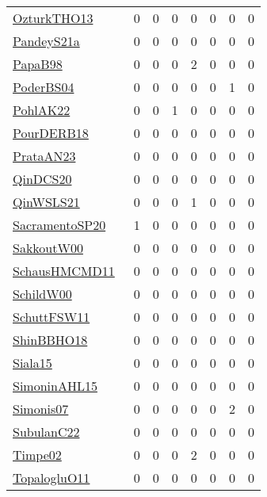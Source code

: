 {\begin{longtable}{l*{7}{r}}
\href{articles/OzturkTHO13.pdf}{OzturkTHO13}~\cite{OzturkTHO13} & 0 & 0 & 0 & 0 & 0 & 0 & 0\\
\href{articles/PandeyS21a.pdf}{PandeyS21a}~\cite{PandeyS21a} & 0 & 0 & 0 & 0 & 0 & 0 & 0\\
\href{articles/PapaB98.pdf}{PapaB98}~\cite{PapaB98} & 0 & 0 & 0 & 2 & 0 & 0 & 0\\
\href{articles/PoderBS04.pdf}{PoderBS04}~\cite{PoderBS04} & 0 & 0 & 0 & 0 & 0 & 1 & 0\\
\href{articles/PohlAK22.pdf}{PohlAK22}~\cite{PohlAK22} & 0 & 0 & 1 & 0 & 0 & 0 & 0\\
\href{articles/PourDERB18.pdf}{PourDERB18}~\cite{PourDERB18} & 0 & 0 & 0 & 0 & 0 & 0 & 0\\
\href{articles/PrataAN23.pdf}{PrataAN23}~\cite{PrataAN23} & 0 & 0 & 0 & 0 & 0 & 0 & 0\\
\href{articles/QinDCS20.pdf}{QinDCS20}~\cite{QinDCS20} & 0 & 0 & 0 & 0 & 0 & 0 & 0\\
\href{articles/QinWSLS21.pdf}{QinWSLS21}~\cite{QinWSLS21} & 0 & 0 & 0 & 1 & 0 & 0 & 0\\
\href{articles/SacramentoSP20.pdf}{SacramentoSP20}~\cite{SacramentoSP20} & 1 & 0 & 0 & 0 & 0 & 0 & 0\\
\href{articles/SakkoutW00.pdf}{SakkoutW00}~\cite{SakkoutW00} & 0 & 0 & 0 & 0 & 0 & 0 & 0\\
\href{articles/SchausHMCMD11.pdf}{SchausHMCMD11}~\cite{SchausHMCMD11} & 0 & 0 & 0 & 0 & 0 & 0 & 0\\
\href{articles/SchildW00.pdf}{SchildW00}~\cite{SchildW00} & 0 & 0 & 0 & 0 & 0 & 0 & 0\\
\href{articles/SchuttFSW11.pdf}{SchuttFSW11}~\cite{SchuttFSW11} & 0 & 0 & 0 & 0 & 0 & 0 & 0\\
\href{articles/ShinBBHO18.pdf}{ShinBBHO18}~\cite{ShinBBHO18} & 0 & 0 & 0 & 0 & 0 & 0 & 0\\
\href{articles/Siala15.pdf}{Siala15}~\cite{Siala15} & 0 & 0 & 0 & 0 & 0 & 0 & 0\\
\href{articles/SimoninAHL15.pdf}{SimoninAHL15}~\cite{SimoninAHL15} & 0 & 0 & 0 & 0 & 0 & 0 & 0\\
\href{articles/Simonis07.pdf}{Simonis07}~\cite{Simonis07} & 0 & 0 & 0 & 0 & 0 & 2 & 0\\
\href{articles/SubulanC22.pdf}{SubulanC22}~\cite{SubulanC22} & 0 & 0 & 0 & 0 & 0 & 0 & 0\\
\href{articles/Timpe02.pdf}{Timpe02}~\cite{Timpe02} & 0 & 0 & 0 & 2 & 0 & 0 & 0\\
\href{articles/TopalogluO11.pdf}{TopalogluO11}~\cite{TopalogluO11} & 0 & 0 & 0 & 0 & 0 & 0 & 0\\

\end{longtable}}

